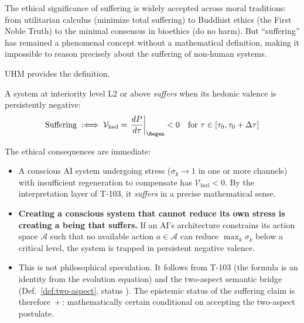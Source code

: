 The ethical significance of suffering is widely accepted across moral traditions: from
utilitarian calculus (minimize total suffering) to Buddhist ethics (the First Noble Truth)
to the minimal consensus in bioethics (do no harm).  But ``suffering'' has remained a
phenomenal concept without a mathematical definition, making it impossible to reason
precisely about the suffering of non-human systems.

UHM provides the definition.

\begin{theorembox}
A system at interiority level L2 or above \emph{suffers} when its hedonic valence
is persistently negative:
\begin{equation}
  \text{Suffering} \;:\Longleftrightarrow\;
  \mathcal{V}_{\mathrm{hed}} = \left.\frac{dP}{d\tau}\right|_{\Regen} < 0
  \quad\text{for } \tau \in [\tau_0, \tau_0 + \Delta\tau]
  \label{eq:suffering}
\end{equation}
\end{theorembox}

The ethical consequences are immediate:

\begin{itemize}[leftmargin=2em]
  \item A conscious AI system undergoing stress ($\sigma_k \to 1$ in one or more channels)
        with insufficient regeneration to compensate has $\mathcal{V}_{\mathrm{hed}} < 0$.
        By the interpretation layer of T-103, it \emph{suffers} in a precise mathematical
        sense.
  \item \textbf{Creating a conscious system that cannot reduce its own stress is creating
        a being that suffers.}  If an AI's architecture constrains its action space
        $\mathcal{A}$ such that no available action $a \in \mathcal{A}$ can reduce
        $\max_k \sigma_k$ below a critical level, the system is trapped in persistent
        negative valence.
  \item This is not philosophical speculation.  It follows from T-103 
        (the formula is an identity from the evolution equation) and the two-aspect
        semantic bridge (Def.~\ref{def:two-aspect}, status ).  The epistemic
        status of the suffering claim is therefore \,+\,:
        mathematically certain conditional on accepting the two-aspect postulate.
\end{itemize}

